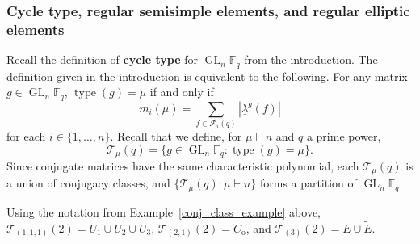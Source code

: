 \documentclass[Unicode,ALCO]{cedram}
\DeclareMathOperator{\GL}{GL}
\DeclareMathOperator{\type}{type}
\newcommand{\F}{\mathbb{F}}
\newcommand{\CF}{\mathcal{F}}
\newcommand{\CT}{\mathcal{T}}
\newcommand{\myemph}{\textbf}
\newcommand{\ulambda}{{\underline{\lambda}}}
\begin{document}
\subsubsection{Cycle type, regular semisimple elements, and regular elliptic elements}
\label{cycle_rs_re}

Recall the definition of \myemph{cycle type} for \(\GL_n \F_q\) from the introduction.
The definition given in the introduction is equivalent to the following.
For any matrix \(g \in \GL_n \F_q\), \(\type (g) = \mu\) if and only if
\[
m_i (\mu)
=
\sum_{f \in \CF_i (q)}
| \ulambda^g (f) |
\]
for each \(i \in \{1,\ldots,n\}\).
Recall that we define, for \(\mu \vdash n\) and \(q\) a prime power,
\begin{equation}
\label{type_set}
\CT_\mu (q) = \{g \in \GL_n \F_q : \type (g) = \mu \}.
\end{equation}
Since conjugate matrices have the same characteristic polynomial, each $\CT_\mu (q)$ is a union of conjugacy classes, and $\{\CT_\mu (q): \mu \vdash n\}$ forms a partition of $\GL_n \F_q$.
\begin{example}
Using the notation from Example~\ref{conj_class_example} above,
\(\CT_{(1,1,1)} (2) = U_1 \cup U_2 \cup U_3\),
\(\CT_{(2,1)} (2) = C_{\mathrm{o}}\), and
\(\CT_{(3)} (2) = E \cup \tilde{E}\).
\end{example}
\end{document}
